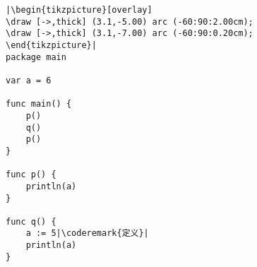 \begin{lstlisting}[caption=局部作用域,label=src:scope1]
|\begin{tikzpicture}[overlay]
\draw [->,thick] (3.1,-5.00) arc (-60:90:2.00cm);
\draw [->,thick] (3.1,-7.00) arc (-60:90:0.20cm);
\end{tikzpicture}|
package main

var a = 6

func main() {
    p()
    q()
    p()
}

func p() {
    println(a)
}

func q() {
    a := 5|\coderemark{定义}|
    println(a)
}
\end{lstlisting}
